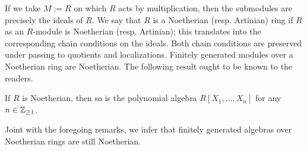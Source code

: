 If we take $M := R$ on which $R$ acts by multiplication, then the submodules are precisely the ideals of $R$. We say that $R$ is a Noetherian (resp. Artinian) ring if $R$ as an $R$-module is Noetherian (resp. Artinian); this translates into the corresponding chain conditions on the ideals. Both chain conditions are preserved under passing to quotients and localizations. Finitely generated modules over a Noetherian ring are Noetherian. The following result ought to be known to the readers.
\begin{theorem} 
	If $R$ is Noetherian, then so is the polynomial algebra $R[X_1, \ldots, X_n]$ for any $n \in \mathbb{Z}_{\geq 1}$.
\end{theorem}
Joint with the foregoing remarks, we infer that finitely generated algebras over Noetherian rings are still Noetherian.


